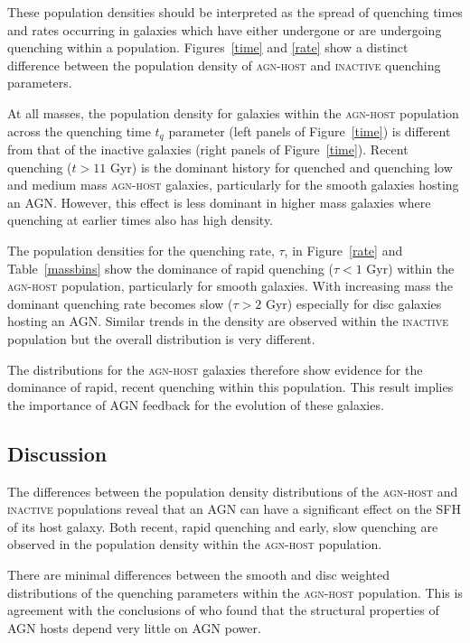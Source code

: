 These population densities should be interpreted as the spread of quenching times and rates occurring in galaxies which have either undergone or are undergoing quenching within a population. Figures~\ref{time} and \ref{rate} show a distinct difference between the population density of \textsc{agn-host} and \textsc{inactive} quenching parameters.

At all masses, the population density for galaxies within the \textsc{agn-host} population across the quenching time $t_q$ parameter (left panels of Figure~\ref{time}) is different from that of the inactive galaxies (right panels of Figure~\ref{time}). Recent quenching ($t > 11$ Gyr) is the dominant history for quenched and quenching low and medium mass \textsc{agn-host} galaxies, particularly for the smooth galaxies hosting an AGN. However, this effect is less dominant in higher mass galaxies where quenching at earlier times also has high density.


The population densities for the quenching rate, $\tau$, in Figure~\ref{rate} and Table~\ref{massbins} show the dominance of rapid quenching ($\tau < 1$ Gyr) within the \textsc{agn-host} population, particularly for smooth galaxies. With increasing mass the dominant quenching rate becomes slow ($\tau > 2$ Gyr) especially for disc galaxies hosting an AGN. Similar trends in the density are observed within the \textsc{inactive} population but the overall distribution is very different. 


The distributions for the \textsc{agn-host} galaxies therefore show evidence for the dominance of rapid, recent quenching within this population. This result implies the importance of AGN feedback for the evolution of these galaxies.

\subsection{Discussion}\label{dis}

The differences between the population density distributions of the \textsc{agn-host} and \textsc{inactive} populations reveal that an AGN can have a significant effect on the SFH of its host galaxy. Both recent, rapid quenching and early, slow quenching are observed in the population density within the \textsc{agn-host} population. 


There are minimal differences between the smooth and disc weighted distributions of the quenching parameters within the \textsc{agn-host} population. This is agreement with the conclusions of \citet{kauffmann03b} who found that the structural properties of AGN hosts depend very little on AGN power. 


